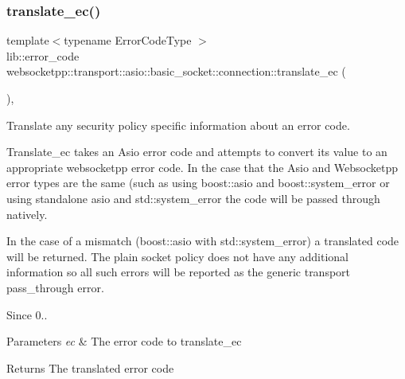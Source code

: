 \subsubsection{\texorpdfstring{translate\+\_\+ec()}{translate\_ec()}\hspace{0.1cm}{\footnotesize\ttfamily [1/2]}}
{\footnotesize\ttfamily template$<$typename Error\+Code\+Type $>$ \\
lib\+::error\+\_\+code websocketpp\+::transport\+::asio\+::basic\+\_\+socket\+::connection\+::translate\+\_\+ec (\begin{DoxyParamCaption}\item[{Error\+Code\+Type}]{ }\end{DoxyParamCaption})\hspace{0.3cm}{\ttfamily [inline]}, {\ttfamily [protected]}}



Translate any security policy specific information about an error code. 

Translate\+\_\+ec takes an Asio error code and attempts to convert its value to an appropriate websocketpp error code. In the case that the Asio and Websocketpp error types are the same (such as using boost\+::asio and boost\+::system\+\_\+error or using standalone asio and std\+::system\+\_\+error the code will be passed through natively.

In the case of a mismatch (boost\+::asio with std\+::system\+\_\+error) a translated code will be returned. The plain socket policy does not have any additional information so all such errors will be reported as the generic transport pass\+\_\+through error.

\begin{DoxySince}{Since}
0..
\end{DoxySince}

\begin{DoxyParams}{Parameters}
{\em ec} & The error code to translate\+\_\+ec \\
\hline
\end{DoxyParams}
\begin{DoxyReturn}{Returns}
The translated error code 
\end{DoxyReturn}
\mbox{\label{classwebsocketpp_1_1transport_1_1asio_1_1basic__socket_1_1connection_a92b3f3132f48c3b57f48514557f6e653}} 
